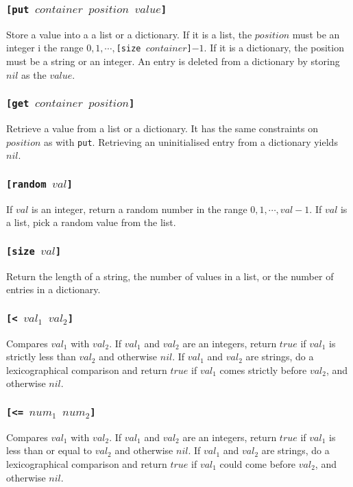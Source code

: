 \subsubsection{\tt{[put }$container$ $position$ $value$\tt{]}}
Store a value into a a list or a dictionary. If it is a list, the $position$ must be an integer i the range $0,1, \cdots, ${\tt{[size }}$container${\tt{]}}$-1$.
If it is a dictionary, the position must be a string or an integer. An entry is deleted from a dictionary by storing $nil$ as the $value$.
\subsubsection{\tt{[get }$container$ $position$\tt{]}}
Retrieve a value from a list or a dictionary. It has the same constraints on $position$ as with \verb|put|. Retrieving an uninitialised entry from a dictionary yields $nil$.
\subsubsection{\tt{[random }$val$\tt{]}}
If $val$ is an integer, return a random number in the range $0,1, \cdots, val -1$. If $val$ is a list, pick a random value from the list.
\subsubsection{\tt{[size }$val$\tt{]}}
Return the length of a string, the number of values in a list, or the number of entries in a dictionary.
\subsubsection{\tt{[< }$val_1$ $val_2$\tt{]}}
Compares $val_1$ with $val_2$. If $val_1$ and $val_2$ are an integers, return $true$ if $val_1$ is strictly less than $val_2$ and otherwise $nil$.
If $val_1$ and $val_2$ are strings, do a lexicographical comparison and return $true$ if $val_1$ comes strictly before $val_2$, and otherwise $nil$.
\subsubsection{\tt{[<= }$num_1$ $num_2$\tt{]}}
Compares $val_1$ with $val_2$. If $val_1$ and $val_2$ are an integers, return $true$ if $val_1$ is less than or equal to $val_2$ and otherwise $nil$.
If $val_1$ and $val_2$ are strings, do a lexicographical comparison and return $true$ if $val_1$ could come before $val_2$, and otherwise $nil$.

